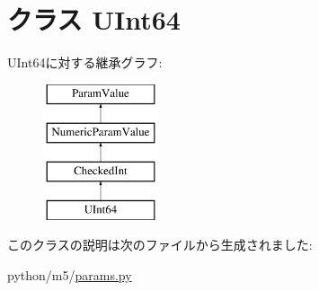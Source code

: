 \hypertarget{classm5_1_1params_1_1UInt64}{
\section{クラス UInt64}
\label{classm5_1_1params_1_1UInt64}
}
UInt64に対する継承グラフ:\begin{figure}[H]
\begin{center}
\leavevmode
\includegraphics[height=4cm]{classm5_1_1params_1_1UInt64}
\end{center}
\end{figure}


このクラスの説明は次のファイルから生成されました:\begin{DoxyCompactItemize}
\item 
python/m5/\hyperlink{params_8py}{params.py}\end{DoxyCompactItemize}
